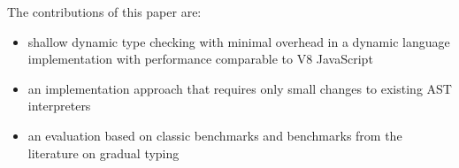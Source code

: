 The contributions of this paper are:

\begin{itemize}
\item shallow dynamic type checking with minimal overhead
      in a dynamic language implementation
      with performance comparable to V8 JavaScript
\item an implementation approach that requires
      only small changes to existing AST interpreters
\item an evaluation based on classic benchmarks
      and benchmarks from the literature on gradual typing
\end{itemize}
